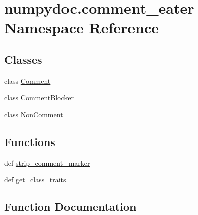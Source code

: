 \hypertarget{namespacenumpydoc_1_1comment__eater}{}\section{numpydoc.\+comment\+\_\+eater Namespace Reference}
\label{namespacenumpydoc_1_1comment__eater}
\subsection*{Classes}
\begin{DoxyCompactItemize}
\item 
class \hyperlink{classnumpydoc_1_1comment__eater_1_1Comment}{Comment}
\item 
class \hyperlink{classnumpydoc_1_1comment__eater_1_1CommentBlocker}{Comment\+Blocker}
\item 
class \hyperlink{classnumpydoc_1_1comment__eater_1_1NonComment}{Non\+Comment}
\end{DoxyCompactItemize}
\subsection*{Functions}
\begin{DoxyCompactItemize}
\item 
def \hyperlink{namespacenumpydoc_1_1comment__eater_ae23e5e605f069a607b8d7aabd90285fd}{strip\+\_\+comment\+\_\+marker}
\item 
def \hyperlink{namespacenumpydoc_1_1comment__eater_a835b593fa9172f5db4e0f8a954150917}{get\+\_\+class\+\_\+traits}
\end{DoxyCompactItemize}


\subsection{Function Documentation}
\hypertarget{namespacenumpydoc_1_1comment__eater_a835b593fa9172f5db4e0f8a954150917}{}
